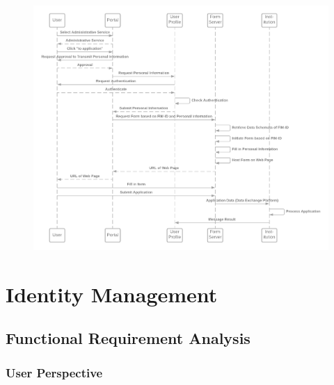 \documentclass[
     12pt,         %
     a4paper,      %
     BCOR=10mm,version=first,     %
     DIV=14,version=first,        %
     ]{scrreprt}
\begin{document}
\begin{figure}[!h]
    \centering
    \includegraphics[width=17cm]{Diagrams/Basic Use Case Sequence Diagram.png}
\end{figure}


\chapter{Identity Management}

\section{Functional Requirement Analysis}

\subsection{User Perspective}
\end{document}
